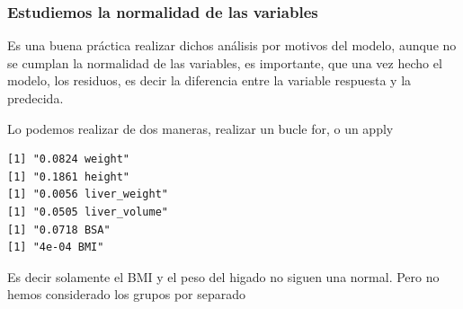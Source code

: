 \documentclass[
  letterpaper,
  DIV=11,
  numbers=noendperiod]{scrartcl}
\newenvironment{Shaded}{\begin{snugshade}}{\end{snugshade}}
\newcommand{\AttributeTok}[1]{\textcolor[rgb]{0.40,0.45,0.13}{#1}}
\newcommand{\ControlFlowTok}[1]{\textcolor[rgb]{0.00,0.23,0.31}{#1}}
\newcommand{\DecValTok}[1]{\textcolor[rgb]{0.68,0.00,0.00}{#1}}
\newcommand{\FunctionTok}[1]{\textcolor[rgb]{0.28,0.35,0.67}{#1}}
\newcommand{\NormalTok}[1]{\textcolor[rgb]{0.00,0.23,0.31}{#1}}
\newcommand{\OtherTok}[1]{\textcolor[rgb]{0.00,0.23,0.31}{#1}}
\newcommand{\SpecialCharTok}[1]{\textcolor[rgb]{0.37,0.37,0.37}{#1}}
\newcommand{\StringTok}[1]{\textcolor[rgb]{0.13,0.47,0.30}{#1}}
\begin{document}
\hypertarget{estudiemos-la-normalidad-de-las-variables}{%
\subsubsection{Estudiemos la normalidad de las
variables}\label{estudiemos-la-normalidad-de-las-variables}}

Es una buena práctica realizar dichos análisis por motivos del modelo,
aunque no se cumplan la normalidad de las variables, es importante, que
una vez hecho el modelo, los residuos, es decir la diferencia entre la
variable respuesta y la predecida.

Lo podemos realizar de dos maneras, realizar un bucle for, o un apply

\begin{Shaded}
\end{Shaded}

\begin{verbatim}
[1] "0.0824 weight"
[1] "0.1861 height"
[1] "0.0056 liver_weight"
[1] "0.0505 liver_volume"
[1] "0.0718 BSA"
[1] "4e-04 BMI"
\end{verbatim}

Es decir solamente el BMI y el peso del higado no siguen una normal.
Pero no hemos considerado los grupos por separado

\begin{Shaded}
\end{Shaded}
\end{document}
